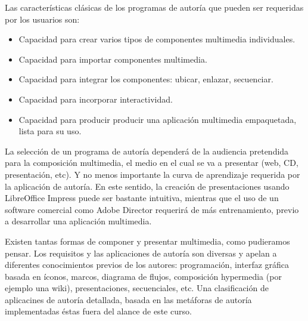 \documentclass[12pt]{article}
\begin{document}
Las características clásicas de los programas de autoría que pueden 
ser requeridas por los usuarios son: 

\begin{itemize}
\item Capacidad para crear varios tipos de componentes multimedia individuales.
\item Capacidad para importar componentes multimedia.
\item Capacidad para integrar los componentes: ubicar, enlazar, secuenciar. 
\item Capacidad para incorporar interactividad. 
\item Capacidad para producir producir una aplicación multimedia empaquetada, 
lista para su uso. 
\end{itemize}

La selección de un programa de autoría dependerá de la audiencia pretendida
para la composición multimedia, el medio en el cual se va a presentar (web, 
CD, presentación, etc). Y no menos importante la curva de aprendizaje 
requerida por la aplicación de autoría. En este sentido, la creación de 
presentaciones usando LibreOffice Impress puede ser bastante intuitiva, 
mientras que el uso de un software comercial como Adobe Director requerirá
de más entrenamiento, previo a desarrollar una aplicación multimedia.  

Existen tantas formas de componer y presentar multimedia, como 
pudieramos pensar. Los requisitos y las aplicaciones de autoría son diversas 
y apelan a diferentes conocimientos previos de los autores: programación, 
interfaz gráfica basada en íconos, marcos, diagrama de flujos, composición
hypermedia (por ejemplo una wiki), presentaciones, 
secuenciales, etc. Una clasificación de aplicacines de autoría
detallada, basada en las metáforas de autoría implementadas éstas fuera 
del alance de este curso.
\end{document}
